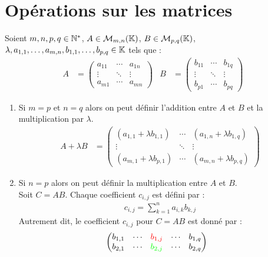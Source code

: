 \section{Opérations sur les matrices}
\begin{definition}
	Soient $m, n, p, q \in \mathbb{N}^*$, $A \in \mathcal{M}_{m, n}(\mathbb{K})$, $B \in \mathcal{M}_{p, q}(\mathbb{K})$, $\lambda, a_{1,1}, \ldots, a_{m,n}, b_{1,1}, \ldots, b_{p,q} \in \mathbb{K}$ tels que :
	\begin{align*}
		A &=
		\begin{pmatrix}
			a_{11} & \cdots & a_{1n} \\
			\vdots & \ddots & \vdots \\
			a_{m1} & \cdots & a_{mn}
		\end{pmatrix}
		&
		B &= 
		\begin{pmatrix}
			b_{11} & \cdots & b_{1q} \\
			\vdots & \ddots & \vdots \\
			b_{p1} & \cdots & b_{pq}
		\end{pmatrix}
	\end{align*}
	\begin{enumerate}
		\item Si $m = p$ et $n = q$ alors on peut définir l'addition entre $A$ et $ B$ et la multiplication par $\lambda$.
		\begin{align*}
			A + \lambda B &= 
			\begin{pmatrix}
				(a_{1,1} + \lambda b_{1,1}) & \cdots & (a_{1,n} + \lambda b_{1,q}) \\
				\vdots & \ddots & \vdots \\
				(a_{m,1} + \lambda b_{p,1}) & \cdots & (a_{m,n} + \lambda b_{p,q})
			\end{pmatrix}
		\end{align*}
		\item Si $n = p$ alors on peut définir la multiplication entre $A$ et $B$.\\
		Soit $C = AB$. Chaque coefficient $c_{i,j}$ est défini par :
		\begin{align*}
			c_{i,j} = \sum_{k=1}^{n} a_{i,k} b_{k,j}
		\end{align*}
        Autrement dit, le coefficient $c_{i,j}$ pour $C = AB$ est donné par :
        \begin{align*}
            &\begin{pmatrix}
                b_{1,1} & \cdots & \color{red}b_{1,j} & \cdots & b_{1,q} \\
                b_{2,1} & \cdots & \color{green}b_{2,j} & \cdots & b_{2,q} \\

\end{pmatrix}
\end{align*}
\end{enumerate}
\end{definition}

